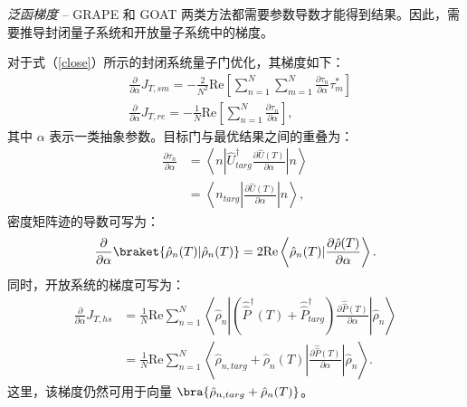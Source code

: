 \textit{泛函梯度} -- GRAPE 和 GOAT 两类方法都需要参数导数才能得到结果。因此，需要推导封闭量子系统和开放量子系统中的梯度。

对于式（\ref{close}）所示的封闭系统量子门优化，其梯度如下：
\begin{equation}
    \begin{split}
        &\frac{\partial}{\partial \alpha}J_{T,sm}=-\frac{2}{N^{2}}\mathrm{Re}\left[\sum_{n=1}^{N}\sum_{m=1}^{N}\frac{\partial \tau_{n}}{\partial \alpha}\tau^{*}_{m}\right]\\
        &\frac{\partial}{\partial \alpha}J_{T,re}=-\frac{1}{N}\mathrm{Re}\left[\sum_{n=1}^{N}\frac{\partial \tau_{n}}{\partial \alpha}\right],
    \end{split}
\end{equation}
其中 $\alpha$ 表示一类抽象参数。目标门与最优结果之间的重叠为：
\begin{equation}
    \begin{split}
        \frac{\partial \tau_{n}}{\partial \alpha}&=\left<n\left|\hat{U}^{\dagger}_{targ}\frac{\partial\hat{U}(T)}{\partial \alpha}\right|n\right>\\
        &=\left<n_{targ}\left|\frac{\partial \hat{U}(T)}{\partial \alpha}\right|n\right>,
    \end{split}
\end{equation}
密度矩阵迹的导数可写为：
\begin{equation}
    \begin{split}
        \frac{\partial}{\partial \alpha}\braket{\hat{\rho}_{n}(T)|\hat{\rho}_{n}(T)}=2\mathrm{Re}\left<\hat{\rho}_{n}(T)|\frac{\partial \hat{\rho}(T)}{\partial \alpha}\right>.
    \end{split}
    \label{overlap}
\end{equation}
同时，开放系统的梯度可写为：
\begin{equation}
    \begin{split}
        \frac{\partial}{\partial \alpha}J_{T,hs}&=\frac{1}{N}\mathrm{Re}\sum_{n=1}^{N}\left<\hat{\rho}_{n}\left|\left(\hat{\hat{P}}^{\dagger}(T)+\hat{\hat{P}}^{\dagger}_{targ}\right)\frac{\partial \hat{\hat{P}}(T)}{\partial \alpha}\right|\hat{\rho}_{n}\right>\\
        &=\frac{1}{N}\mathrm{Re}\sum_{n=1}^{N}\left<\hat{\rho}_{n,targ}+\hat{\rho}_{n}(T)\left|\frac{\partial\hat{\hat{P}}(T)}{\partial \alpha}\right|\hat{\rho}_{n}\right>.
    \end{split}
\end{equation}
这里，该梯度仍然可用于向量 $\bra{\hat{\rho}_{n,targ}+\hat{\rho}_{n}(T)}$。

